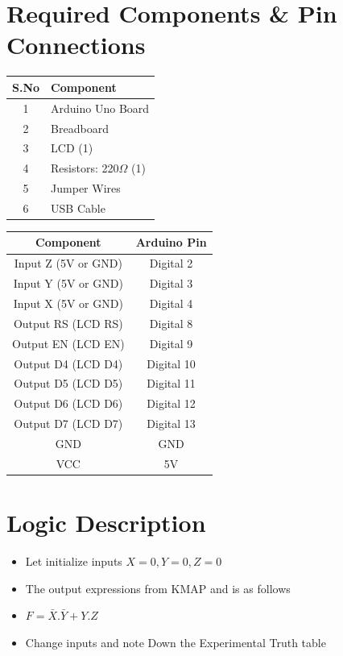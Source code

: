 \documentclass[a4paper,12pt]{article}
\begin{document}
\section*{Required Components \& Pin Connections}
\begin{center}
\begin{minipage}{0.45\textwidth}
\begin{table}[H]
\centering
\begin{tabular}{|c|l|}
\hline
\textbf{S.No} & \textbf{Component} \\ \hline
1 & Arduino Uno Board \\
2 & Breadboard \\
3 & LCD (1) \\
4 & Resistors: 220$\Omega$ (1) \\
5 & Jumper Wires \\
6 & USB Cable \\
\hline
\end{tabular}
\end{table}
\end{minipage}
\hspace{0.05\textwidth}
\begin{minipage}{0.45\textwidth}
\begin{table}[H]
\centering
\begin{tabular}{|c|c|}
\hline
\textbf{Component} & \textbf{Arduino Pin} \\ \hline
Input Z (5V or GND) & Digital 2 \\
Input Y (5V or GND) & Digital 3 \\
Input X (5V or GND) & Digital 4 \\
Output RS (LCD RS) & Digital 8 \\
Output EN (LCD EN) & Digital 9 \\
Output D4 (LCD D4) & Digital 10 \\
Output D5 (LCD D5) & Digital 11 \\
Output D6 (LCD D6) & Digital 12 \\
Output D7 (LCD D7) & Digital 13 \\
GND & GND \\
VCC & 5V \\
\hline
\end{tabular}
\end{table}
\end{minipage}
\end{center}
\section*{Logic Description}
\begin{itemize}
        \item Let initialize inputs $X=0,Y=0,Z=0$
        \item The output expressions from KMAP and is as follows
	\item $F=\bar{X}.\bar{Y}+Y.Z$
	\item Change inputs and note Down the Experimental Truth table
\end{itemize}
\end{document}
